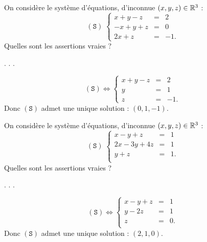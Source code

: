 \begin{question}
On considère le système d'équations, d'inconnue $(x,y,z)\in \mathbb{R}^3$ :  
$$(\mathtt{S}) \; \left\{\begin{array}{rcc}
x+y-z&=&2\\
-x+y+z&=&0\\
2x+z&=&-1.\end{array}\right.$$
Quelles sont les assertions vraies ?
\begin{answers}  
.
.
.
\end{answers}
\begin{explanations} 
$$(\mathtt{S}) \Leftrightarrow  \left\{\begin{array}{rcc}
x+y-z&=&2\\
y&=&1\\ 
z&=&-1.\end{array}\right.$$ 
Donc $(\mathtt{S})$ admet une unique solution : $(0,1,-1)$.
\end{explanations}
\end{question}


\begin{question}
On considère le système d'équations, d'inconnue $(x,y,z)\in \mathbb{R}^3$ :  
$$(\mathtt{S}) \; \left\{\begin{array}{rcc}
x-y+z&=&1\\
2x-3y+4z&=&1\\ 
y+z&=&1.\\
\end{array}\right.$$
Quelles sont les assertions vraies ?
\begin{answers}  
.
.
.
\end{answers}
\begin{explanations} 
$$(\mathtt{S}) \Leftrightarrow  \left\{\begin{array}{rcc}
x-y+z&=&1\\
y-2z&=&1\\ 
z&=&0.\\ 
\end{array}\right.$$
Donc $(\mathtt{S})$ admet une unique solution : $(2,1,0)$.
\end{explanations}
\end{question}


